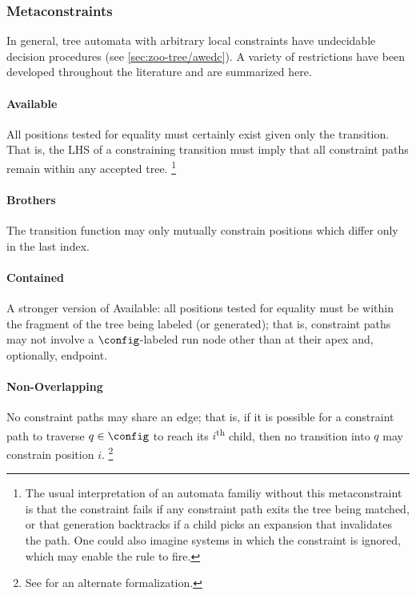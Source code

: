 \subsubsection{Metaconstraints}

In general, tree automata with arbitrary local constraints have undecidable
decision procedures (see \autoref{sec:zoo-tree/awedc}).  A variety of
restrictions have been developed throughout the literature and are
summarized here.

\paragraph{Available} All positions tested for equality must certainly exist
given only the transition.  That is, the LHS of a constraining transition
must imply that all constraint paths remain within any accepted tree.%
%
\footnote{The usual interpretation of an automata familiy without this
metaconstraint is that the constraint fails if any constraint path exits the
tree being matched, or that generation backtracks if a child picks an
expansion that invalidates the path.  One could also imagine systems in
which the constraint is ignored, which may enable the rule to fire.}

\paragraph{Brothers} The transition function may only mutually constrain
positions which differ only in the last index.

\paragraph{Contained} A stronger version of Available: all positions tested
for equality must be within the fragment of the tree being labeled (or
generated); that is, constraint paths may not involve a $\config$-labeled
run node other than at their apex and, optionally, endpoint.

\paragraph{Non-Overlapping} No constraint paths may share an edge; that is,
if it is possible for a constraint path to traverse $q \in \config$ to reach
its $i$\textsuperscript{th} child, then no transition into $q$ may constrain
position $i$.%
%
\footnote{See \cite[Exercise 4.8]{tata} for an alternate formalization.}

